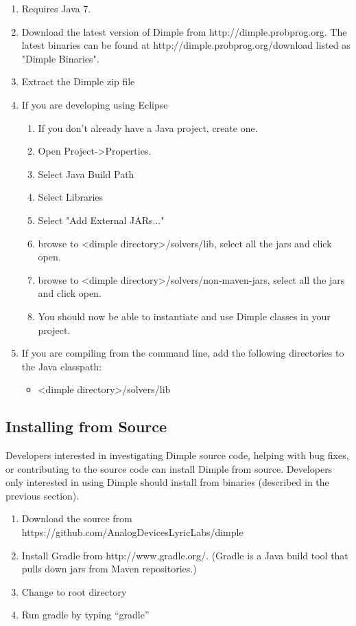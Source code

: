 \fi

\ifjava

\begin{enumerate}
\item Requires Java 7.
\item Download the latest version of Dimple from http://dimple.probprog.org.  The latest binaries can be found at http://dimple.probprog.org/download listed as "Dimple Binaries".
\item Extract the Dimple  zip file
\item If you are developing using Eclipse
\begin{enumerate}
\item If you don't already have a Java project, create one.
\item Open Project-\textgreater Properties.
\item Select Java Build Path
\item Select Libraries
\item Select "Add External JARs..."
\item browse to \textless dimple directory\textgreater /solvers/lib, select all the jars and click open.
\item browse to \textless dimple directory\textgreater /solvers/non-maven-jars, select all the jars and click open.
\item You should now be able to instantiate and use Dimple classes in your project.
\end{enumerate}
\item If you are compiling from the command line, add the following directories to the Java classpath:
\begin{itemize}
\item \textless dimple directory\textgreater /solvers/lib
\end{itemize}
\end{enumerate}

\fi

\subsection{Installing from Source}

Developers interested in investigating Dimple source code, helping with bug fixes, or contributing to the source code can install Dimple from source.  Developers only interested in using Dimple should install from binaries (described in the previous section).

\begin{enumerate}
\item Download the source from https://github.com/AnalogDevicesLyricLabs/dimple
\item Install Gradle from http://www.gradle.org/.  (Gradle is a Java build tool that pulls down jars from Maven repositories.)
\item Change to root directory
\item Run gradle by typing ``gradle''
\end{enumerate}

